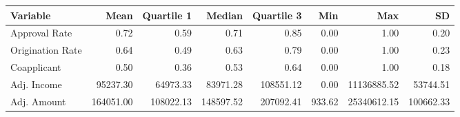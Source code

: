 \begin{tabular}{lrrrrrrr}
  \hline
Variable & Mean & Quartile 1 & Median & Quartile 3 & Min & Max & SD \\ 
  \hline
Approval Rate & 0.72 & 0.59 & 0.71 & 0.85 & 0.00 & 1.00 & 0.20 \\ 
  Origination Rate & 0.64 & 0.49 & 0.63 & 0.79 & 0.00 & 1.00 & 0.23 \\ 
  Coapplicant & 0.50 & 0.36 & 0.53 & 0.64 & 0.00 & 1.00 & 0.18 \\ 
  Adj. Income & 95237.30 & 64973.33 & 83971.28 & 108551.12 & 0.00 & 11136885.52 & 53744.51 \\ 
  Adj. Amount & 164051.00 & 108022.13 & 148597.52 & 207092.41 & 933.62 & 25340612.15 & 100662.33 \\ 
   \hline
\end{tabular}
